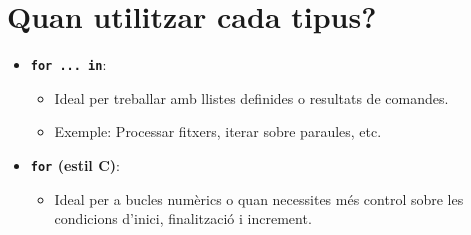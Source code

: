 \documentclass[
  12 pt,
  a4paper,
]{article}
\providecommand{\tightlist}{%
  \setlength{\itemsep}{0pt}\setlength{\parskip}{0pt}}
\begin{document}
\section{\texorpdfstring{\textbf{Quan utilitzar cada
tipus?}}{Quan utilitzar cada tipus?}}\label{quan-utilitzar-cada-tipus}

\begin{itemize}
\tightlist
\item
  \textbf{\texttt{for\ ...\ in}}:

  \begin{itemize}
  \tightlist
  \item
    Ideal per treballar amb llistes definides o resultats de comandes.
  \item
    Exemple: Processar fitxers, iterar sobre paraules, etc.
  \end{itemize}
\item
  \textbf{\texttt{for} (estil C)}:

  \begin{itemize}
  \tightlist
  \item
    Ideal per a bucles numèrics o quan necessites més control sobre les
    condicions d'inici, finalització i increment.
  \end{itemize}
\end{itemize}
\end{document}
